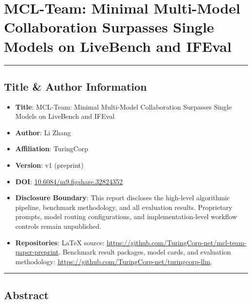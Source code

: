 \documentclass[
]{article}
\author{}
\date{}
\providecommand{\tightlist}{%
  \setlength{\itemsep}{0pt}\setlength{\parskip}{0pt}}
\begin{document}
\section{MCL-Team: Minimal Multi-Model Collaboration Surpasses Single Models on LiveBench and IFEval}\label{title}

\begin{center}\rule{0.5\linewidth}{0.5pt}\end{center}

\subsection{Title \& Author Information}\label{title-author-information}

\begin{itemize}
\tightlist
\item
  \textbf{Title}: MCL-Team: Minimal Multi-Model Collaboration Surpasses Single Models on LiveBench and IFEval
\item
  \textbf{Author}: Li Zhang
\item
  \textbf{Affiliation}: TuringCorp
\item
  \textbf{Version}: v1 (preprint)
\item
  \textbf{DOI}: \href{https://doi.org/10.6084/m9.figshare.32824352}{10.6084/m9.figshare.32824352}
\item
  \textbf{Disclosure Boundary}: This report discloses the high-level algorithmic pipeline, benchmark methodology, and all evaluation results. Proprietary prompts, model routing configurations, and implementation-level workflow controls remain unpublished.
\item
  \textbf{Repositories}: LaTeX source: \url{https://github.com/TuringCorp-net/mcl-team-paper-preprint}. Benchmark result packages, model cards, and evaluation methodology: \url{https://github.com/TuringCorp-net/turingcorp-llm}.
\end{itemize}

\begin{center}\rule{0.5\linewidth}{0.5pt}\end{center}

\subsection{Abstract}\label{abstract}
\end{document}
